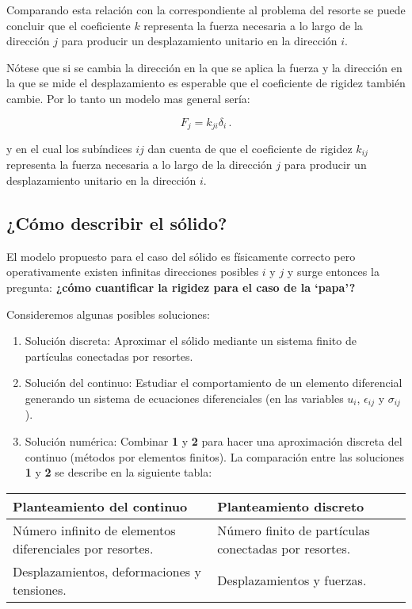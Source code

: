 Comparando esta relación con la correspondiente al problema del resorte se 
puede concluir que el coeficiente $k$ representa la fuerza necesaria a lo largo 
de la dirección $j$ para producir un desplazamiento unitario en la dirección 
$i.$


Nótese que si se cambia la dirección en la que se aplica la fuerza y la 
dirección en la que se mide el desplazamiento es esperable que el coeficiente 
de rigidez también cambie. Por lo tanto un modelo mas general sería:

\begin{equation}
F_j = k_{ji} \delta_i\, .
\end{equation}

y en el cual los subíndices $ij$ dan cuenta de que el coeficiente de rigidez 
$k_{ij}$ representa la fuerza necesaria a lo largo de la dirección $j$ para 
producir un desplazamiento unitario en la dirección $i.$

\subsection{¿Cómo describir el sólido?}

El modelo propuesto para el caso del sólido es físicamente correcto pero 
operativamente existen infinitas direcciones posibles $i$ y $j$ y surge 
entonces la pregunta: \textbf{¿cómo cuantificar la rigidez para el caso de la 
`papa'?}

Consideremos algunas posibles soluciones:
\begin{enumerate}
    \item Solución discreta: Aproximar el sólido mediante un sistema finito de 
    partículas conectadas por resortes.
    \item Solución del continuo: Estudiar el comportamiento de un elemento 
    diferencial generando un sistema de ecuaciones diferenciales (en las 
    variables $u_i$, $\epsilon_{ij}$ y $\sigma_{ij}$).
    \item Solución numérica: Combinar \textbf{1} y \textbf{2} para hacer una 
    aproximación discreta del continuo (métodos por elementos finitos). La 
    comparación entre las soluciones \textbf{1} y \textbf{2} se describe en la 
    siguiente tabla:
\end{enumerate}
%
\begin{table}[H]
\begin{tabular}{p{6cm}p{6cm}}
\hline
\textbf{Planteamiento del continuo} & 
\textbf{Planteamiento discreto}\\
\hline
Número infinito de elementos diferenciales por resortes.
& Número finito de partículas conectadas por resortes.\\
Desplazamientos, deformaciones y tensiones.
& Desplazamientos y fuerzas.\\
\hline
\end{tabular}
\end{table}


